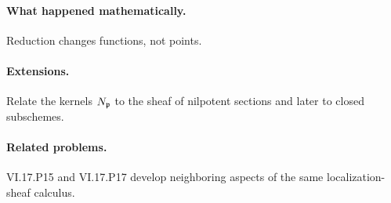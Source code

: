 \paragraph{What happened mathematically.}
Reduction changes functions, not points.

\paragraph{Extensions.}
Relate the kernels $N_{\mathfrak p}$ to the sheaf of nilpotent sections and later to closed subschemes.

\paragraph{Related problems.}
VI.17.P15 and VI.17.P17 develop neighboring aspects of the same localization-sheaf calculus.
\fi
